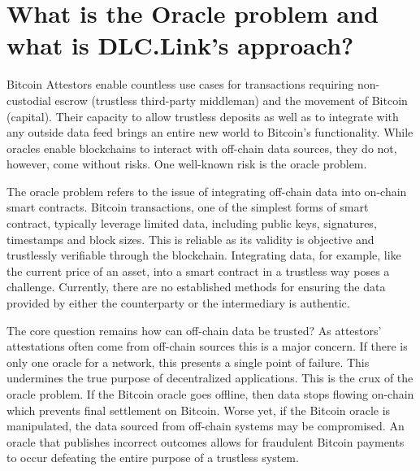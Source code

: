 \documentclass[twoside, a4paper, 11pt]{article}
\begin{document}
  \section{What is the Oracle problem and what is DLC.Link’s approach?}

  Bitcoin Attestors enable countless use cases for transactions requiring non-custodial escrow (trustless third-party middleman) and the movement of Bitcoin (capital). Their capacity to allow trustless deposits as well as to integrate with any outside data feed brings an entire new world to Bitcoin’s functionality. While oracles enable blockchains to interact with off-chain data sources, they do not, however, come without risks. One well-known risk is the oracle problem.

  The oracle problem refers to the issue of integrating off-chain data into on-chain smart contracts. Bitcoin transactions, one of the simplest forms of smart contract, typically leverage limited data, including public keys, signatures, timestamps and block sizes. This is reliable as its validity is objective and trustlessly verifiable through the blockchain. Integrating data, for example, like the current price of an asset, into a smart contract in a trustless way poses a challenge. Currently, there are no established methods for ensuring the data provided by either the counterparty or the intermediary is authentic.

  The core question remains how can off-chain data be trusted? As attestors' attestations often come from off-chain sources this is a major concern. If there is only one oracle for a network, this presents a single point of failure. This undermines the true purpose of decentralized applications. This is the crux of the oracle problem. If the Bitcoin oracle goes offline, then data stops flowing on-chain which prevents final settlement on Bitcoin. Worse yet, if the Bitcoin oracle is manipulated, the data sourced from off-chain systems may be compromised. An oracle that publishes incorrect outcomes allows for fraudulent Bitcoin payments to occur defeating the entire purpose of a trustless system.
\end{document}
